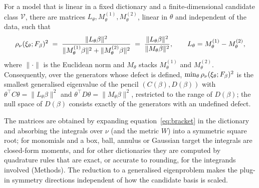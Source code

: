 \begin{lemma}
\label{lem:bilinear}
For a model that is linear in a fixed dictionary and a finite-dimensional
candidate class $\mathcal V$,
there are matrices $L_\theta, M^{(1)}_\theta, M^{(2)}_\theta$, linear in
$\theta$ and independent of the data, such that
\begin{equation}
  \rho_\nu(\xi_\theta; F_\beta)^2
  \;=\; \frac{\|L_\theta \beta\|^2}
             {\|M^{(1)}_\theta \beta\|^2 + \|M^{(2)}_\theta \beta\|^2}
  \;=\; \frac{\|L_\theta \beta\|^2}{\|M_\theta \beta\|^2},
  \qquad L_\theta = M^{(1)}_\theta - M^{(2)}_\theta ,
  \label{eq:ratio}
\end{equation}
where $\|\cdot\|$ is the Euclidean norm and $M_\theta$ stacks $M^{(1)}_\theta$
and $M^{(2)}_\theta$. Consequently, over the generators whose defect is
defined, $\min_\theta \rho_\nu(\xi_\theta;F_\beta)^2$ is the smallest
generalised eigenvalue of the pencil $(C(\beta), D(\beta))$ with
$\theta^{\!\top}C\theta = \|L_\theta\beta\|^2$ and $\theta^{\!\top}D\theta =
\|M_\theta\beta\|^2$, restricted to the range of $D(\beta)$; the null space of
$D(\beta)$ consists exactly of the generators with an undefined defect.
\end{lemma}

The matrices are obtained by expanding equation~\eqref{eq:bracket} in the
dictionary and absorbing the integrals over $\nu$ (and the metric $W$) into a
symmetric square root; for monomials and a box, ball, annulus or Gaussian
target the integrals are closed-form moments, and for other dictionaries they
are computed by quadrature rules that are exact, or accurate to rounding, for
the integrands involved (Methods). The reduction to a generalised eigenproblem
makes the plug-in symmetry directions independent of how the candidate basis is
scaled.
